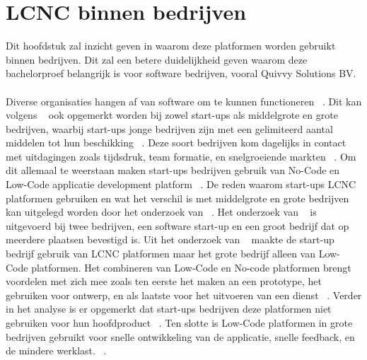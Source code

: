 \section{LCNC binnen bedrijven}
\label{sec:lcnc-bedrijven}
Dit hoofdstuk zal inzicht geven in waarom deze platformen worden gebruikt binnen bedrijven. 
Dit zal een betere duidelijkheid geven waarom deze bachelorproef belangrijk is voor software bedrijven, vooral Quivvy Solutions BV.
\\
\\
Diverse organisaties hangen af van software om te kunnen functioneren ~\autocite{Hintsch2021}. 
Dit kan volgens ~\textcite{Rafiq_2022} ook opgemerkt worden bij zowel start-ups als middelgrote en grote bedrijven, waarbij start-ups jonge bedrijven 
zijn met een gelimiteerd aantal middelen tot hun beschikking ~\autocite{Rafiq_2022}. Deze soort bedrijven kom dagelijks in contact met uitdagingen zoals tijdsdruk, 
team formatie, en snelgroeiende markten ~\autocite{Rafiq_2022}. Om dit allemaal te weerstaan maken start-ups bedrijven gebruik van No-Code en Low-Code applicatie 
development platform ~\autocite{Rafiq_2022}. De reden waarom start-ups LCNC platformen gebruiken en wat het verschil is met middelgrote en grote bedrijven kan 
uitgelegd worden door het onderzoek van ~\textcite{Rafiq_2022}. Het onderzoek van ~\textcite{Rafiq_2022} is uitgevoerd bij twee bedrijven, een software start-up en 
een groot bedrijf dat op meerdere plaatsen bevestigd is. Uit het onderzoek van ~\textcite{Rafiq_2022} maakte de start-up bedrijf gebruik van LCNC platformen maar 
het grote bedrijf alleen van Low-Code platformen. Het combineren van Low-Code en No-code platformen brengt voordelen met zich mee zoals ten eerste het maken 
an een prototype, het gebruiken voor ontwerp, en als laatste voor het uitvoeren van een dienst ~\autocite{Rafiq_2022}. Verder in het analyse is er opgemerkt dat start-ups 
bedrijven deze platformen niet gebruiken voor hun hoofdproduct ~\autocite{Rafiq_2022}. Ten slotte is Low-Code platformen in grote bedrijven gebruikt voor snelle ontwikkeling 
van de applicatie, snelle feedback, en de mindere werklast. ~\autocite{Rafiq_2022}.
